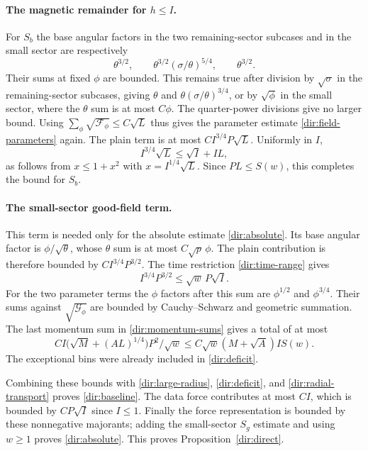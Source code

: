 \paragraph{The magnetic remainder for $h\le I$.}
For $S_b$ the base angular factors in the two remaining-sector subcases and
in the small sector are respectively
\[
 \theta^{3/2},\qquad
 \theta^{3/2}(\sigma/\theta)^{5/4},\qquad
 \theta^{3/2}.
\]
Their sums at fixed $\phi$ are bounded.  This remains true after
division by $\sqrt\sigma$ in the remaining-sector subcases, giving
$\theta$ and $\theta(\sigma/\theta)^{3/4}$, or by $\sqrt\phi$ in
the small sector, where the $\theta$ sum is at most $C\phi$.
The quarter-power divisions give no larger bound.  Using
$\sum_\phi\sqrt{\mathcal F_\phi}\le C\sqrt L$ thus gives the
parameter estimate \eqref{dir:field-parameters} again.
The plain term is at most $CI^{3/4}P\sqrt L$.  Uniformly in $I$,
\begin{equation}\label{dir:plain-magnetic}
 I^{3/4}\sqrt L\le \sqrt I+IL,
\end{equation}
as follows from $x\le1+x^2$ with $x=I^{1/4}\sqrt L$.
Since $PL\le S(w)$, this completes the bound for $S_b$.

\paragraph{The small-sector good-field term.}
This term is needed only for the absolute estimate
\eqref{dir:absolute}.  Its base angular factor is
$\phi/\sqrt\theta$, whose $\theta$ sum is at most
$C\sqrt p\,\phi$.  The plain contribution is therefore bounded by
$CI^{3/4}P^{3/2}$.  The time restriction \eqref{dir:time-range} gives
\[
 I^{3/4}P^{3/2}\le \sqrt w\,P\sqrt I.
\]
For the two parameter terms the $\phi$ factors after this sum are
$\phi^{1/2}$ and $\phi^{3/4}$.  Their sums against
$\sqrt{\mathcal G_\phi}$ are bounded by Cauchy--Schwarz and
geometric summation.  The last momentum sum in
\eqref{dir:momentum-sums} gives a total of at most
\[
 CI\bigl(\sqrt M+(AL)^{1/4}\bigr)P^2/\sqrt w
 \le C\sqrt w(M+\sqrt A)I S(w).
\]
The exceptional bins were already included in \eqref{dir:deficit}.

Combining these bounds with \eqref{dir:large-radius},
\eqref{dir:deficit}, and \eqref{dir:radial-transport} proves
\eqref{dir:baseline}.  The data force contributes at most $CI$,
which is bounded by $CP\sqrt I$ since $I\le1$.
Finally the force representation is bounded by these nonnegative
majorants; adding the small-sector $S_g$ estimate and using $w\ge1$
proves \eqref{dir:absolute}.  This proves
Proposition~\ref{dir:direct}.
